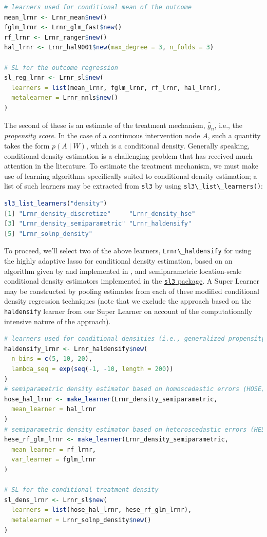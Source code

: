 \documentclass[12pt, krantz2,]{krantz}
\newcommand{\passthrough}[1]{#1}
\theoremstyle{definition}
\theoremstyle{definition}
\theoremstyle{definition}
\newcommand{\1}{\mathbbm{1}}
\begin{document}
\begin{lstlisting}[language=R]
# learners used for conditional mean of the outcome
mean_lrnr <- Lrnr_mean$new()
fglm_lrnr <- Lrnr_glm_fast$new()
rf_lrnr <- Lrnr_ranger$new()
hal_lrnr <- Lrnr_hal9001$new(max_degree = 3, n_folds = 3)

# SL for the outcome regression
sl_reg_lrnr <- Lrnr_sl$new(
  learners = list(mean_lrnr, fglm_lrnr, rf_lrnr, hal_lrnr),
  metalearner = Lrnr_nnls$new()
)
\end{lstlisting}

The second of these is an estimate of the treatment mechanism, \(\hat{g}_n\),
i.e., the \emph{propensity score}. In the case of a continuous intervention node \(A\),
such a quantity takes the form \(p(A \mid W)\), which is a conditional density.
Generally speaking, conditional density estimation is a challenging problem that
has received much attention in the literature. To estimate the treatment
mechanism, we must make use of learning algorithms specifically suited to
conditional density estimation; a list of such learners may be extracted from
\passthrough{\lstinline!sl3!} by using \passthrough{\lstinline!sl3\_list\_learners()!}:

\begin{lstlisting}[language=R]
sl3_list_learners("density")
[1] "Lrnr_density_discretize"     "Lrnr_density_hse"           
[3] "Lrnr_density_semiparametric" "Lrnr_haldensify"            
[5] "Lrnr_solnp_density"         
\end{lstlisting}

To proceed, we'll select two of the above learners, \passthrough{\lstinline!Lrnr\_haldensify!} for using
the highly adaptive lasso for conditional density estimation, based on an
algorithm given by \citet{diaz2011super} and implemented in \citet{hejazi2020haldensify}, and
semiparametric location-scale conditional density estimators implemented in the
\href{https://github.com/tlverse/sl3}{\passthrough{\lstinline!sl3!} package}. A Super Learner may be
constructed by pooling estimates from each of these modified conditional density
regression techniques (note that we exclude the approach based on the
\passthrough{\lstinline!haldensify!} learner from our Super Learner on account of the computationally
intensive nature of the approach).

\begin{lstlisting}[language=R]
# learners used for conditional densities (i.e., generalized propensity score)
haldensify_lrnr <- Lrnr_haldensify$new(
  n_bins = c(5, 10, 20),
  lambda_seq = exp(seq(-1, -10, length = 200))
)
# semiparametric density estimator based on homoscedastic errors (HOSE)
hose_hal_lrnr <- make_learner(Lrnr_density_semiparametric,
  mean_learner = hal_lrnr
)
# semiparametric density estimator based on heteroscedastic errors (HESE)
hese_rf_glm_lrnr <- make_learner(Lrnr_density_semiparametric,
  mean_learner = rf_lrnr,
  var_learner = fglm_lrnr
)

# SL for the conditional treatment density
sl_dens_lrnr <- Lrnr_sl$new(
  learners = list(hose_hal_lrnr, hese_rf_glm_lrnr),
  metalearner = Lrnr_solnp_density$new()
)
\end{lstlisting}
\end{document}
